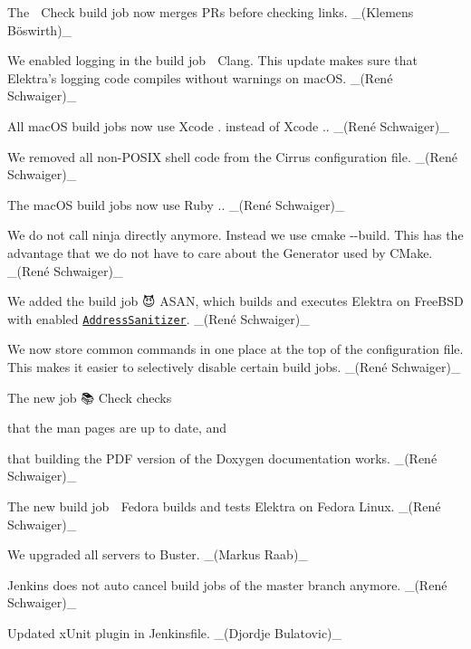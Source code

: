 \begin{DoxyItemize}
\item The {\ttfamily 🔗 Check} build job now merges P\+Rs before checking links. \+\_\+(Klemens Böswirth)\+\_\+
\item We enabled logging in the build job {\ttfamily 🍎 Clang}. This update makes sure that Elektra’s logging code compiles without warnings on mac\+OS. \+\_\+(René Schwaiger)\+\_\+
\item All mac\+OS build jobs now use Xcode {.} instead of Xcode {.}. \+\_\+(René Schwaiger)\+\_\+
\item We removed all non-\/\+P\+O\+S\+IX shell code from the Cirrus configuration file. \+\_\+(René Schwaiger)\+\_\+
\item The mac\+OS build jobs now use Ruby {.}. \+\_\+(René Schwaiger)\+\_\+
\item We do not call {\ttfamily ninja} directly anymore. Instead we use {\ttfamily cmake -\/-\/build}. This has the advantage that we do not have to care about the Generator used by C\+Make. \+\_\+(René Schwaiger)\+\_\+
\item We added the build job {\ttfamily 😈 A\+S\+AN}, which builds and executes Elektra on Free\+B\+SD with enabled \href{https://github.com/google/sanitizers/wiki/AddressSanitizer}{\tt Address\+Sanitizer}. \+\_\+(René Schwaiger)\+\_\+
\item We now store common commands in one place at the top of the configuration file. This makes it easier to selectively disable certain build jobs. \+\_\+(René Schwaiger)\+\_\+
\item The new job {\ttfamily 📚 Check} checks
\begin{DoxyItemize}
\item that the man pages are up to date, and
\item that building the P\+DF version of the Doxygen documentation works. \+\_\+(René Schwaiger)\+\_\+
\end{DoxyItemize}
\item The new build job {\ttfamily 🐧 Fedora} builds and tests Elektra on Fedora Linux. \+\_\+(René Schwaiger)\+\_\+
\end{DoxyItemize}


\begin{DoxyItemize}
\item We upgraded all servers to Buster. \+\_\+(\+Markus Raab)\+\_\+
\item Jenkins does not auto cancel build jobs of the {\ttfamily master} branch anymore. \+\_\+(René Schwaiger)\+\_\+
\item Updated x\+Unit plugin in Jenkinsfile. \+\_\+(\+Djordje Bulatovic)\+\_\+
\end{DoxyItemize}


